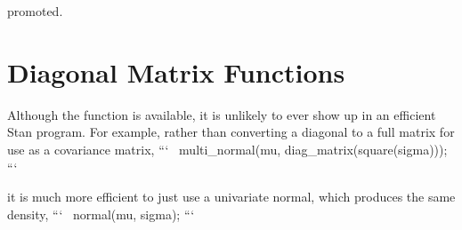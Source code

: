 \begin{description}
\begin{description}
\begin{description}
\begin{description}
\begin{description}
\begin{description}
\begin{description}
\begin{description}
\begin{description}
\begin{description}
\begin{description}
\begin{description}
\begin{description}
\begin{description}
\begin{description}
\begin{description}
\begin{description}
\begin{description}
\begin{description}
\begin{description}
\begin{description}
\begin{description}
\begin{description}
\begin{description}
\begin{description}
\begin{description}
\begin{description}
\begin{description}
\begin{description}
\begin{description}
\begin{description}
\begin{description}
\begin{description}
\begin{description}
\begin{description}
\begin{description}
\begin{description}
\begin{description}
\begin{description}
\begin{description}
\begin{description}
\begin{description}
\begin{description}
\begin{description}
\begin{description}
\begin{description}
\begin{description}
\begin{description}
\begin{description}
\begin{description}
\begin{description}
\begin{description}
\begin{description}
promoted.

\section{Diagonal Matrix Functions}

\begin{description} %

 Although the  function is available, it is unlikely to ever show up in an efficient Stan program.  For example, rather than converting a diagonal to a full matrix for use as a covariance matrix,
```\ny ~ multi_normal(mu, diag_matrix(square(sigma))); \n```

it is much more efficient to just use a univariate normal, which produces the same density,
```\ny ~ normal(mu, sigma); \n```



\end{description}
\end{description}
\end{description}
\end{description}
\end{description}
\end{description}
\end{description}
\end{description}
\end{description}
\end{description}
\end{description}
\end{description}
\end{description}
\end{description}
\end{description}
\end{description}
\end{description}
\end{description}
\end{description}
\end{description}
\end{description}
\end{description}
\end{description}
\end{description}
\end{description}
\end{description}
\end{description}
\end{description}
\end{description}
\end{description}
\end{description}
\end{description}
\end{description}
\end{description}
\end{description}
\end{description}
\end{description}
\end{description}
\end{description}
\end{description}
\end{description}
\end{description}
\end{description}
\end{description}
\end{description}
\end{description}
\end{description}
\end{description}
\end{description}
\end{description}
\end{description}
\end{description}
\end{description}
\end{description}
